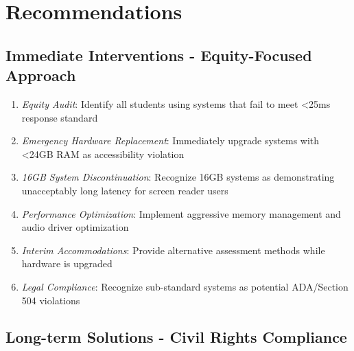 \pagebreak

\hypertarget{recommendations}{}\section{Recommendations}\label{recommendations}

\subsection{Immediate Interventions - Equity-Focused Approach}\label{immediate-interventions-equity-focused-approach}

\begin{enumerate}
	\item \emph{Equity Audit}: Identify all students using systems that fail to meet <25ms response standard \supercite{EducationalEquityReport2024}
	\item \emph{Emergency Hardware Replacement}: Immediately upgrade systems with <24GB RAM as accessibility violation \supercite{ADA1990, Section504RehabAct}
	\item \emph{16GB System Discontinuation}: Recognize 16GB systems as demonstrating unacceptably long latency for screen reader users \supercite{EducationalEquityReport2024}
	\item \emph{Performance Optimization}: Implement aggressive memory management and audio driver optimization \supercite{SystemOptimizationGuides}
	\item \emph{Interim Accommodations}: Provide alternative assessment methods while hardware is upgraded \supercite{AccommodationsBestPractices}
	\item \emph{Legal Compliance}: Recognize sub-standard systems as potential ADA/Section 504 violations \supercite{ADA1990, Section504RehabAct}
\end{enumerate}

\subsection{Long-term Solutions - Civil Rights Compliance}\label{long-term-solutions-civil-rights-compliance}

